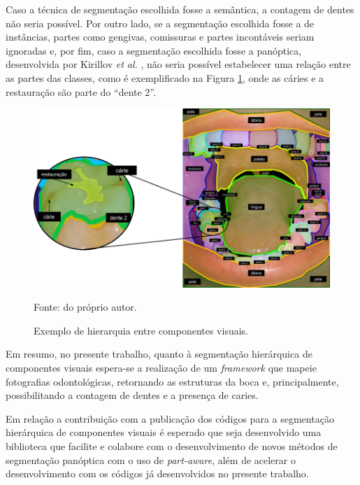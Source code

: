Caso a técnica de segmentação escolhida fosse a semântica, a contagem de dentes não seria possível. Por outro lado, se a segmentação escolhida fosse a de instâncias, partes como gengivas, comissuras e partes incontáveis seriam ignoradas e, por fim, caso a segmentação escolhida fosse a panóptica, desenvolvida por Kirillov \textit{et al.} \cite{Kirillov2019a}, não seria possível estabelecer uma relação entre as partes das classes, como é exemplificado na Figura \ref{proposal:expres:fig:6}, onde as cáries e a restauração são parte do ``dente 2''.

\begin{figure}[H]
    \centering
    \caption{Exemplo de hierarquia entre componentes visuais.}
    \includegraphics[width=1\textwidth]{recursos/imagens/proposal/segmentada.png}
    \label{proposal:expres:fig:6}

    \vspace*{1 cm}
    Fonte: do próprio autor.
\end{figure}

Em resumo, no presente trabalho, quanto à segmentação hierárquica de componentes visuais espera-se a realização de um \textit{framework} que mapeie fotografias odontológicas, retornando as estruturas da boca e, principalmente, possibilitando a contagem de dentes e a presença de caries.
 
Em relação a contribuição com a publicação dos códigos para a segmentação hierárquica de componentes visuais é esperado que seja desenvolvido uma biblioteca que facilite e colabore com o desenvolvimento de novos métodos de segmentação panóptica com o uso de \textit{part-aware}, além de acelerar o desenvolvimento com os códigos já desenvolvidos no presente trabalho.

